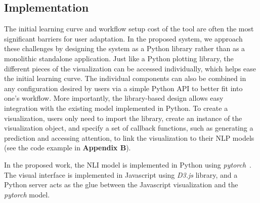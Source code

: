 \subsection{Implementation}
\label{sec:implementation}
The initial learning curve and workflow setup cost of the tool are often the most significant barriers for user adaptation.
In the proposed system, we approach these challenges by designing the system as a Python library rather than as a monolithic standalone application. 
Just like a Python plotting library, the different pieces of the visualization can be accessed individually, which helps ease the initial learning curve. 
The individual components can also be combined in any configuration desired by users via a simple Python API to better fit into one's workflow.
More importantly, the library-based design allows easy integration with the existing model implemented in Python.
%
To create a visualization, users only need to import the library, create an instance of the visualization object, and specify a set of callback functions, such as generating a prediction and accessing attention, to link the visualization to their NLP models (see the code example in \textbf{Appendix B}). 


%
In the proposed work, the NLI model is implemented in Python using \emph{pytorch}~\cite{PaszkeGrossChintala2017}.
The visual interface is implemented in Javascript using \emph{D3.js} library, and a Python server acts as the glue between the Javascript visualization and the \emph{pytorch} model.
